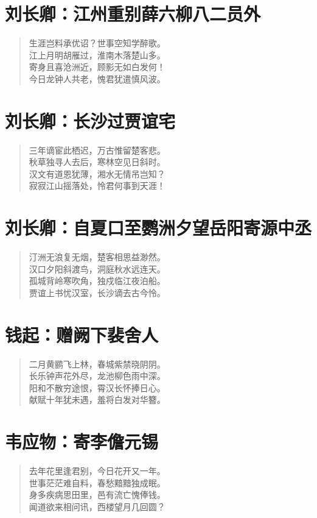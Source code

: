 \documentclass[12pt,oneside]{book}
\newenvironment{shici}{
\begin{verse}
\centering\large\hspace{12pt}}
{\end{verse}}
\begin{document}
\chapter{刘长卿：江州重别薛六柳八二员外}
\begin{shici}
生涯岂料承优诏？世事空知学醉歌。\\
江上月明胡雁过，淮南木落楚山多。\\
寄身且喜沧洲近，顾影无如白发何！\\
今日龙钟人共老，愧君犹遣慎风波。
\end{shici}

\chapter{刘长卿：长沙过贾谊宅}
\begin{shici}
三年谪宦此栖迟，万古惟留楚客悲。\\
秋草独寻人去后，寒林空见日斜时。\\
汉文有道恩犹薄，湘水无情吊岂知？\\
寂寂江山摇落处，怜君何事到天涯！
\end{shici}

\chapter{刘长卿：自夏口至鹦洲夕望岳阳寄源中丞}
\begin{shici}
汀洲无浪复无烟，楚客相思益渺然。\\
汉口夕阳斜渡鸟，洞庭秋水远连天。\\
孤城背岭寒吹角，独戍临江夜泊船。\\
贾谊上书忧汉室，长沙谪去古今怜。
\end{shici}

\chapter{钱起：赠阙下裴舍人}
\begin{shici}
二月黄鹂飞上林，春城紫禁晓阴阴。\\
长乐钟声花外尽，龙池柳色雨中深。\\
阳和不散穷途恨，霄汉长怀捧日心。\\
献赋十年犹未遇，羞将白发对华簪。
\end{shici}

\chapter{韦应物：寄李儋元锡}
\begin{shici}
去年花里逢君别，今日花开又一年。\\
世事茫茫难自料，春愁黯黯独成眠。\\
身多疾病思田里，邑有流亡愧俸钱。\\
闻道欲来相问讯，西楼望月几回圆？
\end{shici}
\end{document}
